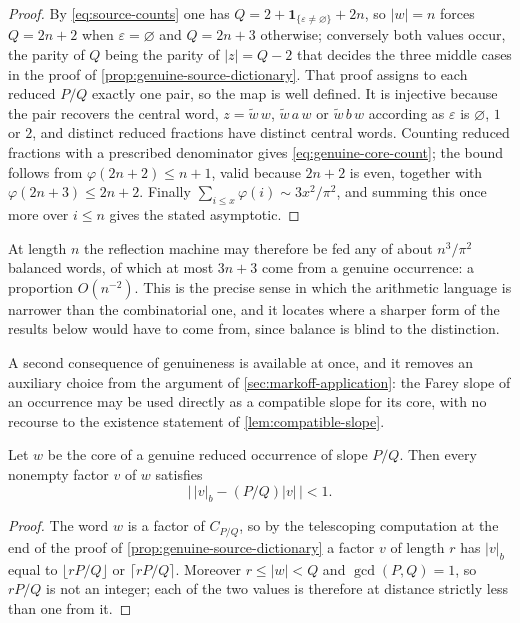\begin{proof}
By \eqref{eq:source-counts} one has
$Q=2+\mathbf1_{\{\varepsilon\ne\varnothing\}}+2n$, so $\lvert w\rvert=n$
forces $Q=2n+2$ when $\varepsilon=\varnothing$ and $Q=2n+3$ otherwise;
conversely both values occur, the parity of $Q$ being the parity of
$\lvert z\rvert=Q-2$ that decides the three middle cases in the proof of
\cref{prop:genuine-source-dictionary}. That proof assigns to each reduced
$P/Q$ exactly one pair, so the map is well defined. It is injective because
the pair recovers the central word, $z=\widetilde w\,w$,
$\widetilde w\,a\,w$ or $\widetilde w\,b\,w$ according as $\varepsilon$ is
$\varnothing$, $1$ or $2$, and distinct reduced fractions have distinct
central words. Counting reduced fractions with a prescribed denominator
gives \eqref{eq:genuine-core-count}; the bound follows from
$\varphi(2n+2)\leqslant n+1$, valid because $2n+2$ is even, together with
$\varphi(2n+3)\leqslant2n+2$. Finally $\sum_{i\leqslant x}\varphi(i)\sim3x^2/\pi^2$,
and summing this once more over $i\leqslant n$ gives the stated asymptotic.
\end{proof}

At length $n$ the reflection machine may therefore be fed any of about
$n^3/\pi^2$ balanced words, of which at most $3n+3$ come from a genuine
occurrence: a proportion $O(n^{-2})$. This is the precise sense in which the
arithmetic language is narrower than the combinatorial one, and it locates
where a sharper form of the results below would have to come from, since
balance is blind to the distinction.

A second consequence of genuineness is available at once, and it removes an
auxiliary choice from the argument of \cref{sec:markoff-application}: the
Farey slope of an occurrence may be used directly as a compatible slope for
its core, with no recourse to the existence statement of
\cref{lem:compatible-slope}.

\begin{corollary}
\label{cor:farey-compatible}
Let $w$ be the core of a genuine reduced occurrence of slope $P/Q$. Then
every nonempty factor $v$ of $w$ satisfies
\begin{equation}
 \bigl\lvert\,\lvert v\rvert_b-(P/Q)\lvert v\rvert\,\bigr\rvert<1.
 \label{eq:farey-compatible}
\end{equation}
\end{corollary}

\begin{proof}
The word $w$ is a factor of $C_{P/Q}$, so by the telescoping computation at
the end of the proof of \cref{prop:genuine-source-dictionary} a factor $v$
of length $r$ has $\lvert v\rvert_b$ equal to $\lfloor rP/Q\rfloor$ or
$\lceil rP/Q\rceil$. Moreover $r\leqslant\lvert w\rvert<Q$ and
$\gcd(P,Q)=1$, so $rP/Q$ is not an integer; each of the two values is
therefore at distance strictly less than one from it.
\end{proof}
